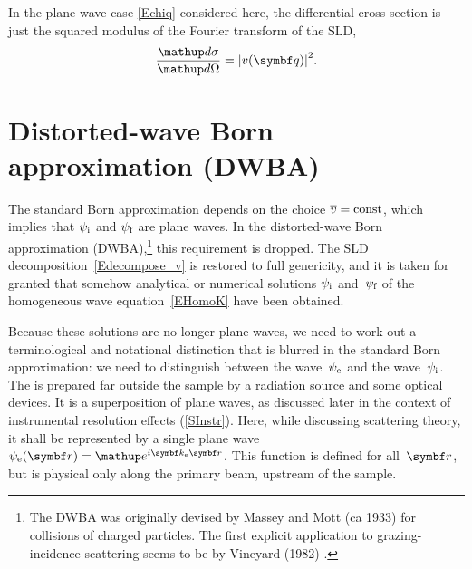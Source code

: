 In the plane-wave case \cref{Echiq} considered here,
the differential cross section is just the squared modulus
of the Fourier transform of the SLD,
%
\begin{equation}\label{Ecross1}
  \frac{\d\sigma}{\d\Omega}
  = {\left| v(\q) \right|}^2.
\end{equation}

\section{Distorted-wave Born approximation (DWBA)}\label{SDWBA}

%
%

The standard Born approximation depends on the choice $\mv=\text{const}$,
which implies that $\psi_\si$ and $\psi_\sf$ are plane waves.
In the distorted-wave Born approximation (DWBA),\footnote{
The DWBA was originally devised by Massey and Mott (ca 1933)
for collisions of charged particles.
The first explicit application to grazing-incidence scattering
seems to be by Vineyard (1982) \cite{Vin82}.}
this requirement is dropped.
The SLD decomposition~\cref{Edecompose_v}
is restored to full genericity,
and it is taken for granted
that somehow analytical or numerical solutions $\psi_\si$ and~$\psi_\sf$
of the homogeneous wave equation~\cref{EHomoK}
have been obtained.

Because these solutions are no longer plane waves,
we need to work out a terminological and notational distinction
that is blurred in the standard Born approximation:
we need to distinguish
 between the  wave~$\psi_\se$
%
and the  wave~$\psi_\si$.
The 
%
%
is prepared far
outside the sample by a radiation source and some optical devices.
%
It is a superposition of plane waves,
as discussed later in the context of instrumental resolution effects
(\cref{SInstr}).
Here, while discussing scattering theory,
it shall be represented by a single plane wave
$\psi_\se(\r)=\e^{i\k_\se\r}$.
This function is defined for all~$\r$,
but is physical only along the primary beam, upstream of the sample.

